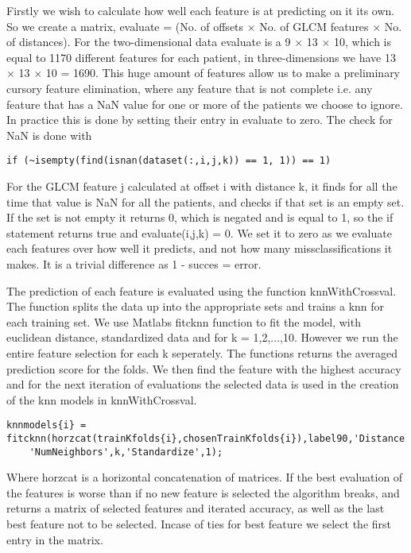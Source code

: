 Firstly we wish to calculate how well each feature is at predicting on it its own. So we create a matrix, evaluate = (No. of offsets $\times$ No. of GLCM features $\times$ No. of distances). For the two-dimensional data evaluate is a 9 $\times$ 13  $\times$ 10, which is equal to 1170 different features for each patient, in three-dimensions we have 13 $\times$  13  $\times$  10 = 1690. This huge amount of features allow us to make a preliminary cursory feature elimination, where any feature that is not complete i.e. any feature that has a NaN value for one or more of the patients we choose to ignore. In practice this is done by setting their entry in evaluate to zero. The check for NaN is done with
\begin{lstlisting}[mathescape=true]
	if (~isempty(find(isnan(dataset(:,i,j,k)) == 1, 1)) == 1)
\end{lstlisting}
For the GLCM feature j calculated at offset i with distance k, it finds for all the time that value is NaN for all the patients, and checks if that set is an empty set. If the set is not empty it returns 0, which is negated and is equal to 1, so the if statement returns true and evaluate(i,j,k) = 0. We set it to zero as we evaluate each features over how well it predicts, and not how many missclassifications it makes. It is a trivial difference as 1 - succes = error.

The prediction of each feature is evaluated using the function knnWithCrossval. The function splits the data up into the appropriate sets and trains a knn for each training set. We use Matlabs fitcknn function to fit the model, with euclidean distance, standardized data and for k = 1,2,...,10. However we run the entire feature selection for each k seperately. The functions returns the averaged prediction score for the folds.
We then find the feature with the highest accuracy and for the next iteration of evaluations the selected data is used in the creation of the knn models in knnWithCrossval.
\begin{lstlisting}[mathescape=true]
    knnmodels{i} = fitcknn(horzcat(trainKfolds{i},chosenTrainKfolds{i}),label90,'Distance','euclidean',...
    'NumNeighbors',k,'Standardize',1);
\end{lstlisting}
Where horzcat is a horizontal concatenation of matrices.
If the best evaluation of the features is worse than if no new feature is selected the algorithm breaks, and returns a matrix of selected features and iterated accuracy, as well as the last best feature not to be selected.
Incase of ties for best feature we select the first entry in the matrix.

